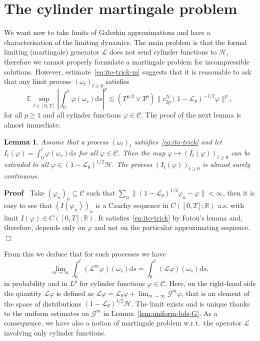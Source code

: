 \documentclass[10pt]{article}
\newcommand{\mathd}{\mathrm{d}}
\newenvironment{proof}{\noindent\textbf{Proof\ }}{\hspace*{\fill}$\Box$\medskip}
\newtheorem{lemma}{Lemma}
\begin{document}
\section{The cylinder martingale problem}\label{sec:cyl-mart}

We want now to take limits of Galerkin approximations and have a
characterisation of the limiting dynamics. The main problem is that the formal
limiting (martingale) generator $\mathcal{L}$ does not send cylinder functions
to $\mathcal{H}$, therefore we cannot properly formulate a martingale problem
for incompressible solutions. However, estimate~{\eqref{eq:ito-trick-m}}
suggests that it is reasonable to ask that any limit process $(\omega_t)_{t
\geqslant 0}$ satisfies
\begin{equation}
  \mathbb{E} \sup_{t \in [0, T]} \left| \int_0^t \varphi (\omega_s) \mathd s
  \right|^p \lesssim (T^{p / 2} \vee T^p) \| c_{2 p}^{\mathcal{N}} (1
  -\mathcal{L}_{\theta})^{- 1 / 2} \varphi \|^p, \label{eq:ito-trick}
\end{equation}
for all $p \geqslant 1$ and all cylinder functions $\varphi \in \mathcal{C}$.
The proof of the next lemma is almost immediate.

\begin{lemma}
  \label{lemma:integral}Assume that a process $(\omega_t)_t$
  satisfies~{\eqref{eq:ito-trick}} and let $I_t (\varphi) = \int_0^t \varphi
  (\omega_s) \mathd s$ for all $\varphi \in \mathcal{C}$. Then the map
  $\varphi \mapsto (I_t (\varphi))_{t \geqslant 0}$ can be extended to all
  $\varphi \in (1 -\mathcal{L}_{\theta})^{1 / 2} \mathcal{H}$. The process
  $(I_t (\varphi))_{t \geqslant 0}$ is almost surely continuous.
\end{lemma}

\begin{proof}
  Take $(\varphi_n)_n \subseteq \mathcal{C}$ such that $\sum_n \| (1
  -\mathcal{L}_{\theta})^{1 / 2} \varphi_n - \varphi \| < \infty$, then it is
  easy to see that $(I (\varphi_n))_n$ is a Cauchy sequence in $C ([0, T] ;
  \mathbb{R})$ a.s. with limit $I (\varphi) \in C ([0, T] ; \mathbb{R})$. It
  satisfies~{\eqref{eq:ito-trick}} by Fatou's lemma and, therefore, depends
  only on $\varphi$ and not on the particular approximating sequence.
\end{proof}

From this we deduce that for such processes we have
\[ \lim_{m \rightarrow \infty} \int_0^t (\mathcal{L}^m \varphi) (\omega_s)
   \mathd s = \int_0^t (\mathcal{L} \varphi) (\omega_s) \mathd s, \]
in probability and in $L^p$ for cylinder functions $\varphi \in \mathcal{C}$.
Here, on the right-hand side the quantity $\mathcal{L} \varphi$ is defined as
$\mathcal{L} \varphi =\mathcal{L}_{\theta} \varphi + \lim_{m \rightarrow
\infty} \mathcal{G}^m \varphi$, that is an element of the space of
distributions $(1 -\mathcal{L}_{\theta})^{1 / 2} \mathcal{H}$. The limit
exists and is unique thanks to the uniform estimates on $\mathcal{G}^m$ in
Lemma~\ref{lem:uniform-bds-G}. As a consequence, we have also a notion of
martingale problem w.r.t.~the operator $\mathcal{L}$ involving only cylinder
functions.
\end{document}
